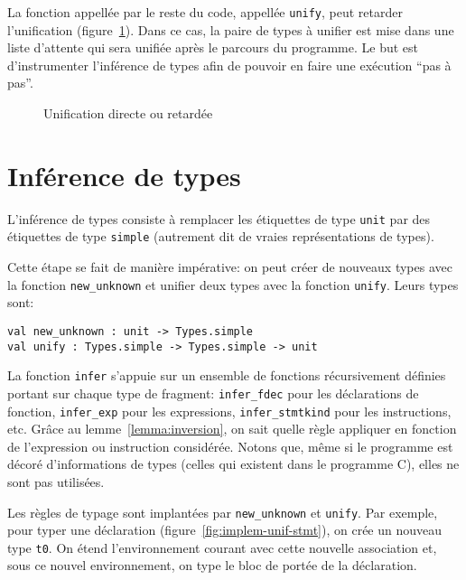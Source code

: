 La fonction appellée par le reste du code, appellée \texttt{unify}, peut
retarder l'unification (figure~\ref{fig:implem-lazy}). Dans ce cas, la paire de
types à unifier est mise dans une liste d'attente qui sera unifiée après le
parcours du programme. Le but est d'instrumenter l'inférence de types afin de
pouvoir en faire une exécution \enquote{pas à pas}.

\begin{figure}


\caption{Unification directe ou retardée}
\label{fig:implem-lazy}
\end{figure}

\section{Inférence de types}

L'inférence de types consiste à remplacer les étiquettes de type \texttt{unit}
par des étiquettes de type \texttt{simple} (autrement dit de vraies
représentations de types).

Cette étape se fait de manière impérative: on peut créer de nouveaux types avec
la fonction \texttt{new\_unknown} et unifier deux types avec la fonction
\texttt{unify}. Leurs types sont:



\begin{verbatim}
val new_unknown : unit -> Types.simple
val unify : Types.simple -> Types.simple -> unit
\end{verbatim}

La fonction \texttt{infer} s'appuie sur un ensemble de fonctions récursivement
définies portant sur chaque type de fragment: \texttt{infer\_fdec} pour les
déclarations de fonction, \texttt{infer\_exp} pour les expressions,
\texttt{infer\_stmtkind} pour les instructions, etc. Grâce au
lemme~\ref{lemma:inversion}, on sait quelle règle appliquer en fonction de
l'expression ou instruction considérée. Notons que, même si le programme
\newspeak est décoré d'informations de types (celles qui existent dans le
programme C), elles ne sont pas utilisées.

Les règles de typage sont implantées par \texttt{new\_unknown} et
\texttt{unify}. Par exemple, pour typer une déclaration
(figure~\ref{fig:implem-unif-stmt}), on crée un nouveau type \texttt{t0}. On
étend l'environnement courant avec cette nouvelle association et, sous ce nouvel
environnement, on type le bloc de portée de la déclaration.

